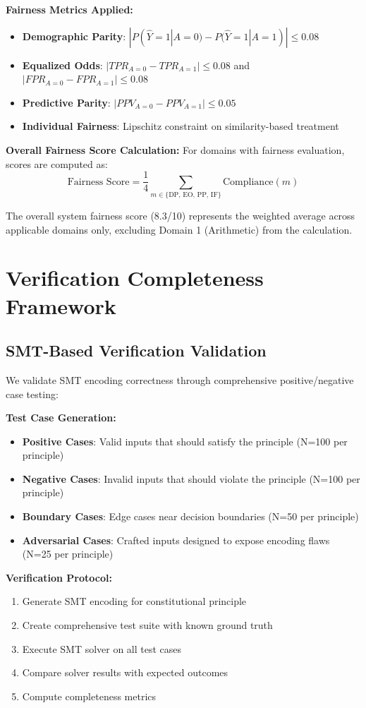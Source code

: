\documentclass[sigconf,natbib]{acmart}
\begin{document}
\textbf{Fairness Metrics Applied:}
\begin{itemize}
    \item \textbf{Demographic Parity}: $|P(\hat{Y} = 1 | A = 0) - P(\hat{Y} = 1 | A = 1)| \leq 0.08$
    \item \textbf{Equalized Odds}: $|TPR_{A=0} - TPR_{A=1}| \leq 0.08$ and $|FPR_{A=0} - FPR_{A=1}| \leq 0.08$
    \item \textbf{Predictive Parity}: $|PPV_{A=0} - PPV_{A=1}| \leq 0.05$
    \item \textbf{Individual Fairness}: Lipschitz constraint on similarity-based treatment
\end{itemize}

\textbf{Overall Fairness Score Calculation:}
For domains with fairness evaluation, scores are computed as:
$$\text{Fairness Score} = \frac{1}{4} \sum_{m \in \{\text{DP, EO, PP, IF}\}} \text{Compliance}(m)$$

The overall system fairness score (8.3/10) represents the weighted average across applicable domains only, excluding Domain 1 (Arithmetic) from the calculation.

\section{Verification Completeness Framework}
\label{app:verification_completeness}

\subsection{SMT-Based Verification Validation}
We validate SMT encoding correctness through comprehensive positive/negative case testing:

\textbf{Test Case Generation:}
\begin{itemize}
    \item \textbf{Positive Cases}: Valid inputs that should satisfy the principle (N=100 per principle)
    \item \textbf{Negative Cases}: Invalid inputs that should violate the principle (N=100 per principle)
    \item \textbf{Boundary Cases}: Edge cases near decision boundaries (N=50 per principle)
    \item \textbf{Adversarial Cases}: Crafted inputs designed to expose encoding flaws (N=25 per principle)
\end{itemize}

\textbf{Verification Protocol:}
\begin{enumerate}
    \item Generate SMT encoding for constitutional principle
    \item Create comprehensive test suite with known ground truth
    \item Execute SMT solver on all test cases
    \item Compare solver results with expected outcomes
    \item Compute completeness metrics
\end{enumerate}
\end{document}
